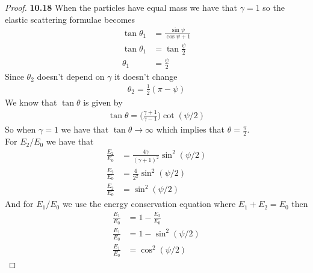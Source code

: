 \documentclass[11pt]{article}
\theoremstyle{definition}
\begin{document}
	\begin{proof}{\textbf{10.18}}
        When the particles have equal mass we have that $\gamma = 1$ so the
        elastic scattering formulae becomes
        \begin{align*}
            \tan\theta_1 &= \frac{\sin\psi}{\cos\psi + 1}\\
            \tan\theta_1 &= \tan\frac{\psi}{2}\\
            \theta_1 &= \frac{\psi}{2}
        \end{align*}
        Since $\theta_2$ doesn't depend on $\gamma$ it doesn't change
        \begin{align*}
            \theta_2 = \frac{1}{2}(\pi - \psi)
        \end{align*}
        We know that $\tan\theta$ is given by
        \begin{align*}
            \tan\theta = \bigg(\frac{\gamma + 1}{\gamma -1}\bigg)\cot(\psi / 2)
        \end{align*}
        So when $\gamma = 1$ we have that $\tan\theta \to \infty$ which implies
        that $\theta = \frac{\pi}{2}$.\\
        For $E_2/E_0$ we have that
        \begin{align*}
            \frac{E_2}{E_0} &= \frac{4\gamma}{(\gamma + 1)^2}\sin^2(\psi/2)\\
            \frac{E_2}{E_0} &= \frac{4}{2^2}\sin^2(\psi/2)\\
            \frac{E_2}{E_0} &= \sin^2(\psi/2)
        \end{align*}
        And for $E_1/E_0$ we use the energy conservation equation where
        $E_1 + E_2 = E_0$ then
        \begin{align*}
            \frac{E_1}{E_0} &= 1 - \frac{E_2}{E_0}\\
            \frac{E_1}{E_0} &= 1 - \sin^2(\psi/2)\\
            \frac{E_1}{E_0} &= \cos^2(\psi/2)
        \end{align*}


\end{proof}
\end{document}
